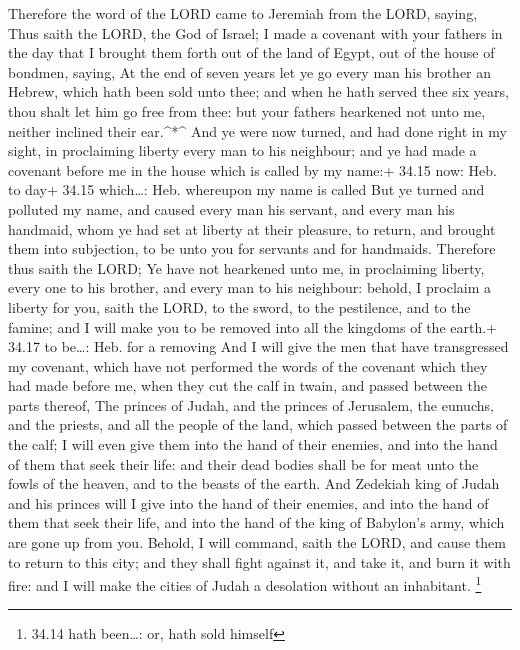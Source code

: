  Therefore the word of the LORD came to Jeremiah from the
LORD, saying,  Thus saith the LORD, the God of Israel; I
made a covenant with your fathers in the day that I brought them forth
out of the land of Egypt, out of the house of bondmen, saying,
 At the end of seven years let ye go every man his brother
an Hebrew, which hath been sold unto thee; and when he hath served thee
six years, thou shalt let him go free from thee: but your fathers
hearkened not unto me, neither inclined their ear.\^{}*\^{}
 And ye were now turned, and had done right in my sight, in
proclaiming liberty every man to his neighbour; and ye had made a
covenant before me in the house which is called by my name:+ 34.15 now:
Heb. to day+ 34.15 which\ldots: Heb. whereupon my name is called
 But ye turned and polluted my name, and caused every man
his servant, and every man his handmaid, whom ye had set at liberty at
their pleasure, to return, and brought them into subjection, to be unto
you for servants and for handmaids.  Therefore thus saith
the LORD; Ye have not hearkened unto me, in proclaiming liberty, every
one to his brother, and every man to his neighbour: behold, I proclaim a
liberty for you, saith the LORD, to the sword, to the pestilence, and to
the famine; and I will make you to be removed into all the kingdoms of
the earth.+ 34.17 to be\ldots: Heb. for a removing  And I
will give the men that have transgressed my covenant, which have not
performed the words of the covenant which they had made before me, when
they cut the calf in twain, and passed between the parts thereof,
 The princes of Judah, and the princes of Jerusalem, the
eunuchs, and the priests, and all the people of the land, which passed
between the parts of the calf;  I will even give them into
the hand of their enemies, and into the hand of them that seek their
life: and their dead bodies shall be for meat unto the fowls of the
heaven, and to the beasts of the earth.  And Zedekiah king
of Judah and his princes will I give into the hand of their enemies, and
into the hand of them that seek their life, and into the hand of the
king of Babylon's army, which are gone up from you. 
Behold, I will command, saith the LORD, and cause them to return to this
city; and they shall fight against it, and take it, and burn it with
fire: and I will make the cities of Judah a desolation without an
inhabitant. \footnote{34.14 hath been\ldots: or, hath sold himself}

